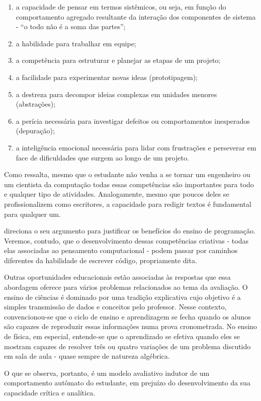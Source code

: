 \begin{enumerate}
  \item a capacidade de pensar em termos sistêmicos, ou seja, em função do comportamento agregado resultante da interação dos componentes de sistema - ``o todo não é a soma das partes''; 
  \item a habilidade para trabalhar em equipe;
  \item a competência para estruturar e planejar as etapas de um projeto;
  \item a facilidade para experimentar novas ideas (prototipagem); 
  \item a destreza para decompor ideias complexas em unidades menores (abstrações);
  \item a perícia necessária para investigar defeitos ou comportamentos inesperados (depuração);
  \item a inteligência emocional necessária para lidar com frustrações e perseverar em face de dificuldades que surgem ao longo de um projeto.  
\end{enumerate}

Como ressalta, mesmo que o estudante não venha a se tornar um engenheiro ou um cientista da computação todas essas competências são importantes para todo e qualquer tipo de atividades. Analogamente, mesmo que poucos deles se profissionalizem como escritores, a capacidade para redigir textos é fundamental para qualquer um.

 direciona o seu argumento para justificar os benefícios do ensino de programação. Veremos, contudo, que o desenvolvimento dessas competências criativas - todas elas associadas ao pensamento computacional - podem passar por caminhos diferentes da habilidade de escrever código, propriamente dita. 

Outras oportunidades educacionais estão associadas às respostas que essa abordagem oferece para vários problemas relacionados ao tema da avaliação. O ensino de ciências é dominado por uma tradição explicativa cujo objetivo é a simples transmissão de dados e conceitos pelo professor. Nesse contexto, convencionou-se que o ciclo de ensino e aprendizagem se fecha quando os alunos são capazes de reproduzir essas informações numa prova cronometrada. No ensino de física, em especial, entende-se que o aprendizado se efetiva quando eles se mostram capazes de resolver três ou quatro variações de um problema  discutido em sala de aula - quase sempre de natureza algébrica. 

O que se observa, portanto, é um modelo avaliativo indutor de um comportamento autômato do estudante, em prejuízo do desenvolvimento da sua capacidade crítica e analítica.

